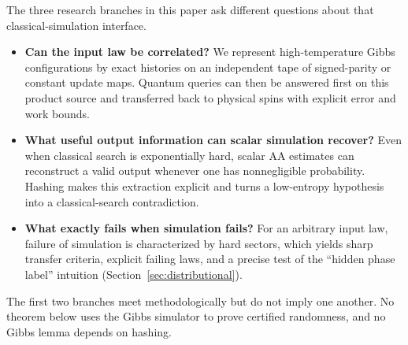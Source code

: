 \documentclass[11pt]{article}
\theoremstyle{definition}\newtheorem{definition}[theorem]{Definition}
\theoremstyle{remark}\newtheorem{remark}[theorem]{Remark}
\begin{document}
The three research branches in this paper ask different questions about that classical-simulation interface.
\begin{itemize}
\item \textbf{Can the input law be correlated?} We represent high-temperature Gibbs configurations by exact histories on an independent tape of signed-parity or constant update maps. Quantum queries can then be answered first on this product source and transferred back to physical spins with explicit error and work bounds.
\item \textbf{What useful output information can scalar simulation recover?} Even when classical search is exponentially hard, scalar AA estimates can reconstruct a valid output whenever one has nonnegligible probability. Hashing makes this extraction explicit and turns a low-entropy hypothesis into a classical-search contradiction.
\item \textbf{What exactly fails when simulation fails?} For an arbitrary input law, failure of simulation is characterized by hard sectors, which yields sharp transfer criteria, explicit failing laws, and a precise test of the ``hidden phase label'' intuition (Section~\ref{sec:distributional}).
\end{itemize}
The first two branches meet methodologically but do not imply one another. No theorem below uses the Gibbs simulator to prove certified randomness, and no Gibbs lemma depends on hashing.

\begin{center}
\end{center}
\end{document}
